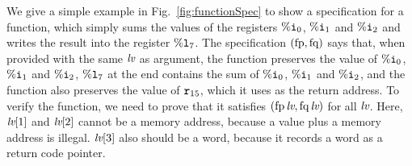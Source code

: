 We give a simple example in Fig.~\ref{fig:functionSpec}
to show a specification for a function,
which simply
sums the values of the registers $\%\texttt{i}_{0}$, $\%\texttt{i}_{1}$ and $\%\texttt{i}_{2}$
and writes the result into the register $\%\texttt{l}_{7}$.
The specification $(\text{fp},\text{fq})$ says that, when
provided with the same $\textit{lv}$ as argument, the function
preserves the value of $\%\texttt{i}_{0}$, $\%\texttt{i}_{1}$ and $\%\texttt{i}_{2}$,
$\%\texttt{l}_{7}$ at the end contains the sum of $\%\texttt{i}_{0}$, $\%\texttt{i}_{1}$ and $\%\texttt{i}_{2}$, and the function also preserves the value of $\texttt{r}_{15}$,
which it uses as the return address.
To verify the function, we need to prove that it satisfies
$(\text{fp}\,\textit{lv}, \text{fq}\,\textit{lv})$ for all $\textit{lv}$. 
Here, $\textit{lv}[1]$ and $\textit{lv}[2]$ cannot be a memory address, 
because a value plus a memory address is illegal. 
$\textit{lv}[3]$ also should be a word, because it 
records a word as a return code pointer. 




